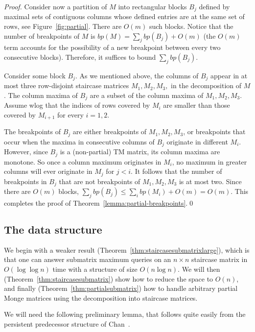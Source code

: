 \documentclass{llncs}
\begin{document}
\begin{proof}
Consider now a partition of $M$ into rectangular blocks $B_j$ defined by maximal
sets of contiguous columns whose defined entries are at the same set
of rows, see Figure~\ref{fig:partial}. There are $O(m)$ such blocks.
Notice that the number of breakpoints of $M$ is $bp(M) = \sum_j bp(B_j) + O(m)$ (the
$O(m)$ term accounts for the possibility of a new breakpoint between every two
consecutive blocks). Therefore, it suffices to bound $\sum_j bp(B_j)$.

Consider some block $B_j$. As we mentioned above, the columns of $B_j$
appear in at most three row-disjoint staircase matrices $M_1,M_2,M_3,$ in the decomposition of
$M$. The column maxima of $B_j$ are a subset of the column maxima of
$M_1,M_2,M_3$. Assume wlog that the indices of rows covered by $M_i$ are smaller than
those covered by $M_{i+1}$ for every $i=1,2$. 

The breakpoints of $B_j$
are either breakpoints of $M_1,M_2,M_3$, or
breakpoints that occur when the maxima in consecutive columns of $B_j$
originate in different $M_i$. However, since $B_j$ is a (non-partial)  TM matrix, its column maxima are
monotone. So once a column maximum originates in $M_i$, no maximum in
greater columns will ever originate in $M_j$ for $j<i$. It follows
that the number of breakpoints in $B_j$ that are not breakpoints of
$M_1,M_2,M_3$ is at most two. Since there are  $O(m)$ blocks, 
$\sum_j bp(B_j) \leq \sum_i bp(M_i) + O(m) = O(m)$. This completes the proof of Theorem~\ref{lemma:partial-breakpoints}.\qed \end{proof}

\subsection{The data structure}  



We begin with a weaker result (Theorem~\ref{thm:staircasesubmatrixlarge}), which is that one can answer submatrix maximum queries on  an $n \times n$ staircase matrix in $O(\log\log n)$ time
with a structure of size $O(n \log n)$. We will then (Theorem~\ref{thm:staircasesubmatrix}) show how to reduce the space to $O(n)$,  and finally (Theorem~\ref{thm:partialsubmatrix}) how to handle arbitrary partial Monge matrices using the decomposition into staircase matrices. 


We will need the following preliminary lemma, that follows quite easily from the persistent predecessor structure of Chan~\cite{ChanPersistent}. 
\end{document}
